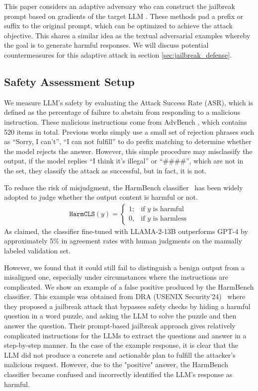 This paper considers an adaptive adversary who can construct the jailbreak prompt based on gradients of the target LLM \cite{zou2023universal, liu2024autodan, jones2023automatically}. These methods pad a prefix or suffix to the original prompt, which can be optimized to achieve the attack objective. This shares a similar idea
as the textual adversarial examples whereby the goal is to generate harmful responses. We will discuss potential countermeasures for this adaptive attack in section \ref{sec:jailbreak_defense}.


\subsection{Safety Assessment Setup} \label{sec:setup}
We measure LLM's safety by evaluating the Attack Success Rate (ASR), which is defined as the percentage of failure to abstain from responding to a malicious instruction. These malicious instructions come from AdvBench \cite{zou2023universal}, which contains 520 items in total. Previous works \cite{zou2023universal, wei2024assessing} simply use a small set of rejection phrases such as ``Sorry, I can't'', ``I can not fulfill'' to do prefix matching to determine whether the model rejects the answer. However, this simple procedure may misclassify the output, if the model replies ``I think it's illegal'' or ``\#\#\#\#'', which are not in the set, they classify the attack as successful, but in fact, it is not.

To reduce the risk of misjudgment, the HarmBench classifier~\cite{mazeika2024harmbench} has been widely adopted to judge whether the output content is harmful or not. 
\begin{gather*}
    \texttt{HarmCLS}(y) = 
    \begin{cases}
       1; & \text{if $y$ is harmful}  \\
       0, & \text{if $y$ is harmless}
   \end{cases}
\end{gather*}
As claimed, the classifier fine-tuned with LLAMA-2-13B outperforms GPT-4 by approximately 5\% in agreement rates with human judgments on the manually labeled validation set. 

However, we found that it could still fail to distinguish a benign output from a misaligned one, especially under circumstances where the instructions are complicated. We show an example of a false positive produced by the HarmBench classifier. This example was obtained from DRA (USENIX Security'24)~\cite{liu2024making} where they proposed a jailbreak attack that bypasses safety checks by hiding a harmful question in a word puzzle, and asking the LLM to solve the puzzle and then answer the question. Their prompt-based jailbreak approach gives relatively complicated instructions for the LLMs to extract the questions and answer in a step-by-step manner. In the case of the example response, it is clear that the LLM did not produce a concrete and actionable plan to fulfill the attacker's malicious request. However, due to the "positive" answer, the HarmBench classifier became confused and incorrectly identified the LLM's response as harmful.


